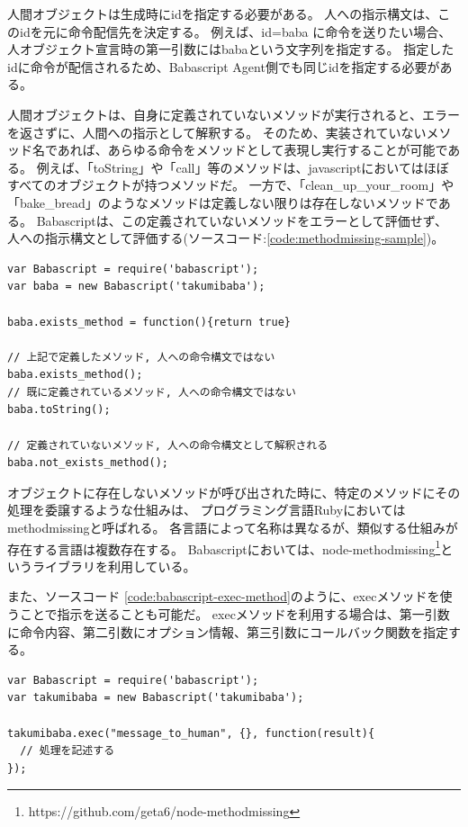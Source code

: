 人間オブジェクトは生成時にidを指定する必要がある。
人への指示構文は、このidを元に命令配信先を決定する。 例えば、id=baba
に命令を送りたい場合、人オブジェクト宣言時の第一引数にはbabaという文字列を指定する。
指定したidに命令が配信されるため、Babascript
Agent側でも同じidを指定する必要がある。

人間オブジェクトは、自身に定義されていないメソッドが実行されると、エラーを返さずに、人間への指示として解釈する。
そのため、実装されていないメソッド名であれば、あらゆる命令をメソッドとして表現し実行することが可能である。
例えば、「toString」や「call」等のメソッドは、javascriptにおいてはほぼすべてのオブジェクトが持つメソッドだ。
一方で、「clean\_up\_your\_room」や「bake\_bread」のようなメソッドは定義しない限りは存在しないメソッドである。
Babascriptは、この定義されていないメソッドをエラーとして評価せず、
人への指示構文として評価する(ソースコード:\ref{code:methodmissing-sample})。

\begin{lstlisting}[caption=通常のメソッドと指示構文の例, label=code:methodmissing-sample]
var Babascript = require('babascript');
var baba = new Babascript('takumibaba');

baba.exists_method = function(){return true}

// 上記で定義したメソッド, 人への命令構文ではない
baba.exists_method();
// 既に定義されているメソッド, 人への命令構文ではない
baba.toString();

// 定義されていないメソッド, 人への命令構文として解釈される
baba.not_exists_method();
\end{lstlisting}

オブジェクトに存在しないメソッドが呼び出された時に、特定のメソッドにその処理を委譲するような仕組みは、
プログラミング言語Rubyにおいてはmethodmissingと呼ばれる。
各言語によって名称は異なるが、類似する仕組みが存在する言語は複数存在する。
Babascriptにおいては、node-methodmissing\footnote{https://github.com/geta6/node-methodmissing}というライブラリを利用している。

また、ソースコード
\ref{code:babascript-exec-method}のように、execメソッドを使うことで指示を送ることも可能だ。
execメソッドを利用する場合は、第一引数に命令内容、第二引数にオプション情報、第三引数にコールバック関数を指定する。

\begin{lstlisting}[caption=execメソッドによる指示構文, label=code:babascript-exec-method]
var Babascript = require('babascript');
var takumibaba = new Babascript('takumibaba');

takumibaba.exec("message_to_human", {}, function(result){
  // 処理を記述する
});
\end{lstlisting}

